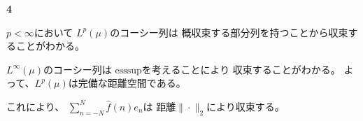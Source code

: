 \documentclass[12pt,b5paper]{ltjsarticle}
\begin{document}
\hrulefill

\newpage

\hrulefill
\textbf{4}
\hrulefill

$p<\infty$において
$L^{p}(\mu)$のコーシー列は
概収束する部分列を持つことから収束することがわかる。

$L^{\infty}(\mu)$のコーシー列は
$\mathrm{ess sup}$を考えることにより
収束することがわかる。
よって、$L^{p}(\mu)$は完備な距離空間である。

これにより、
$\displaystyle \sum_{n=-N}^{N}\hat{f}(n)e_{n}$は
距離$\| \cdot \|_{2}$により収束する。




\hrulefill
\end{document}
